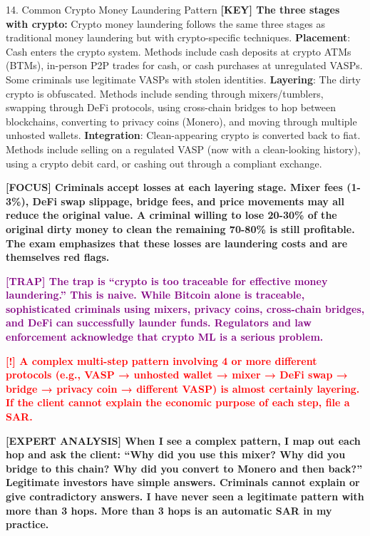 \documentclass[11pt,a4paper]{beamer}
\newcommand{\redflag}[1]{\textcolor{red}{\textbf{[!] #1}}}
\newcommand{\examfocus}[1]{\textcolor{orange!80!black}{\textbf{[FOCUS] #1}}}
\newcommand{\trap}[1]{\textcolor{purple}{\textbf{[TRAP] #1}}}
\newcommand{\keyterm}[1]{\textcolor{red!80!black}{\textbf{[KEY] #1}}}
\newcommand{\expert}[1]{\textcolor{blue!70!black}{\textbf{[EXPERT ANALYSIS] #1}}}
\begin{document}
	\begin{frame}{14. Common Crypto Money Laundering Pattern}
		\tiny
		\keyterm{The three stages with crypto:} Crypto money laundering follows the same three stages as traditional money laundering but with crypto-specific techniques. \textbf{Placement}: Cash enters the crypto system. Methods include cash deposits at crypto ATMs (BTMs), in-person P2P trades for cash, or cash purchases at unregulated VASPs. Some criminals use legitimate VASPs with stolen identities. \textbf{Layering}: The dirty crypto is obfuscated. Methods include sending through mixers/tumblers, swapping through DeFi protocols, using cross-chain bridges to hop between blockchains, converting to privacy coins (Monero), and moving through multiple unhosted wallets. \textbf{Integration}: Clean-appearing crypto is converted back to fiat. Methods include selling on a regulated VASP (now with a clean-looking history), using a crypto debit card, or cashing out through a compliant exchange.
		
		\vspace{0.1cm}
		\examfocus{Criminals accept losses at each layering stage. Mixer fees (1-3\%), DeFi swap slippage, bridge fees, and price movements may all reduce the original value. A criminal willing to lose 20-30\% of the original dirty money to clean the remaining 70-80\% is still profitable. The exam emphasizes that these losses are laundering costs and are themselves red flags.}
		
		\vspace{0.1cm}
		\trap{The trap is “crypto is too traceable for effective money laundering.” This is naive. While Bitcoin alone is traceable, sophisticated criminals using mixers, privacy coins, cross-chain bridges, and DeFi can successfully launder funds. Regulators and law enforcement acknowledge that crypto ML is a serious problem.}
		
		\vspace{0.1cm}
		\redflag{A complex multi-step pattern involving 4 or more different protocols (e.g., VASP → unhosted wallet → mixer → DeFi swap → bridge → privacy coin → different VASP) is almost certainly layering. If the client cannot explain the economic purpose of each step, file a SAR.}
		
		\vspace{0.1cm}
		\expert{When I see a complex pattern, I map out each hop and ask the client: “Why did you use this mixer? Why did you bridge to this chain? Why did you convert to Monero and then back?” Legitimate investors have simple answers. Criminals cannot explain or give contradictory answers. I have never seen a legitimate pattern with more than 3 hops. More than 3 hops is an automatic SAR in my practice.}
	\end{frame}
	
\end{document}
